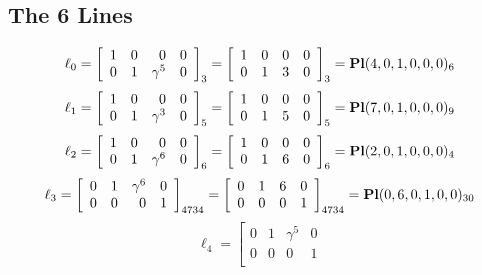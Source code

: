 \documentclass{article}
\begin{document}
{\subsection*{The 6 Lines}
$$
\ell_{0} = 
\left[
\begin{array}{*{4}{r}}
1 & 0 & 0 & 0\\
0 & 1 & \gamma^{5} & 0\\
\end{array}
\right]
_{3}
=
\left[
\begin{array}{*{4}c}
1  & 0  & 0  & 0\\
0  & 1  & 3  & 0\\
\end{array}
\right]_{3}
={\rm\bf Pl}(4,0,1,0,0,0 )_{6}$$
$$
\ell_{1} = 
\left[
\begin{array}{*{4}{r}}
1 & 0 & 0 & 0\\
0 & 1 & \gamma^{3} & 0\\
\end{array}
\right]
_{5}
=
\left[
\begin{array}{*{4}c}
1  & 0  & 0  & 0\\
0  & 1  & 5  & 0\\
\end{array}
\right]_{5}
={\rm\bf Pl}(7,0,1,0,0,0 )_{9}$$
$$
\ell_{2} = 
\left[
\begin{array}{*{4}{r}}
1 & 0 & 0 & 0\\
0 & 1 & \gamma^{6} & 0\\
\end{array}
\right]
_{6}
=
\left[
\begin{array}{*{4}c}
1  & 0  & 0  & 0\\
0  & 1  & 6  & 0\\
\end{array}
\right]_{6}
={\rm\bf Pl}(2,0,1,0,0,0 )_{4}$$
$$
\ell_{3} = 
\left[
\begin{array}{*{4}{r}}
0 & 1 & \gamma^{6} & 0\\
0 & 0 & 0 & 1\\
\end{array}
\right]
_{4734}
=
\left[
\begin{array}{*{4}c}
0  & 1  & 6  & 0\\
0  & 0  & 0  & 1\\
\end{array}
\right]_{4734}
={\rm\bf Pl}(0,6,0,1,0,0 )_{30}$$
$$
\ell_{4} = 
\left[
\begin{array}{*{4}{r}}
0 & 1 & \gamma^{5} & 0\\
0 & 0 & 0 & 1\\

\end{array}$$}
\end{document}
